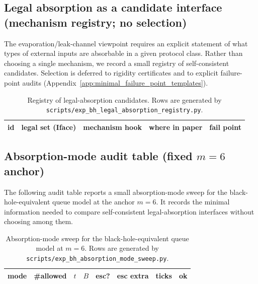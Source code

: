 %

\subsection{Legal absorption as a candidate interface (mechanism registry; no selection)}
\label{subsec:bh4_legal_absorption_registry}

\AuditTag The evaporation/leak-channel viewpoint requires an explicit statement of what types of external inputs
are absorbable in a given protocol class. Rather than choosing a single mechanism, we record a small registry of
self-consistent candidates. Selection is deferred to rigidity certificates and to explicit failure-point audits
(Appendix~\ref{app:minimal_failure_point_templates}).

\begin{table}[t]
\centering
\scriptsize
\setlength{\tabcolsep}{6pt}
\renewcommand{\arraystretch}{1.15}
\begin{tabular}{l l l l l}
\toprule
id & legal set (Iface) & mechanism hook & where in paper & fail point \\
\midrule
%
\end{tabular}
\caption{Registry of legal-absorption candidates. Rows are generated by \texttt{scripts/exp\_bh\_legal\_absorption\_registry.py}.}
\label{tab:bh_legal_absorption_registry}
\end{table}

%

\subsection{Absorption-mode audit table (fixed \texorpdfstring{$m=6$}{m=6} anchor)}
\label{subsec:bh4_absorption_mode_sweep}

\AuditTag The following audit table reports a small absorption-mode sweep for the black-hole-equivalent queue model
at the anchor $m=6$. It records the minimal information needed to compare self-consistent legal-absorption interfaces
without choosing among them.

\begin{table}[t]
\centering
\scriptsize
\setlength{\tabcolsep}{6pt}
\renewcommand{\arraystretch}{1.15}
\begin{tabular}{l r r r r r r r}
\toprule
mode & \#allowed & $t$ & $B$ & esc? & esc extra & ticks & ok \\
\midrule
%
\end{tabular}
\caption{Absorption-mode sweep for the black-hole-equivalent queue model at $m=6$. Rows are generated by \texttt{scripts/exp\_bh\_absorption\_mode\_sweep.py}.}
\label{tab:bh_absorption_mode_sweep_bh4}
\end{table}

